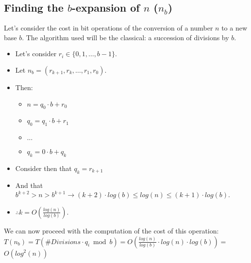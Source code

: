 \documentclass[12pt, a4paper, english]{report}
\begin{document}
\subsection{Finding the $b$-expansion of $n$ ($n_{b}$)}
Let's consider the cost in bit operations of the conversion of a number $n$ to a new base $b$. \newline
The algorithm used will be the classical: a succession of divisions by $b$. \newline
\begin{itemize}
    \item Let's consider $r_{i} \in \{0, 1, \dots, b-1\}$.
    \item Let $n_{b} = (r_{k+1}, r_{k}, \dots, r_{1}, r_{0})$.
    \item Then: \begin{itemize}
                    \item $n = q_{0} \cdot b + r_{0}$
                    \item $q_{0} = q_{1} \cdot b + r_{1}$
                    \item $\dots$
                    \item $q_{k} = 0 \cdot b + q_{k}$
                \end{itemize}
    \item Consider then that $q_{k} = r_{k+1}$
    \item And that $b^{k+2} > n > b^{k+1} \rightarrow (k+2) \cdot log(b) \leq log(n) \leq (k+1) \cdot log(b)$.
    \item $\therefore k = O(\frac{log(n)}{log(b)})$.
\end{itemize}
We can now proceed with the computation of the cost of this operation: \newline
$T(n_{b}) = T(\#Divisions \cdot q_{i} \bmod b) = O(\frac{log(n)}{log(b)} \cdot log(n) \cdot log(b)) = $ \\
$O(log^{2}(n))$
\end{document}
